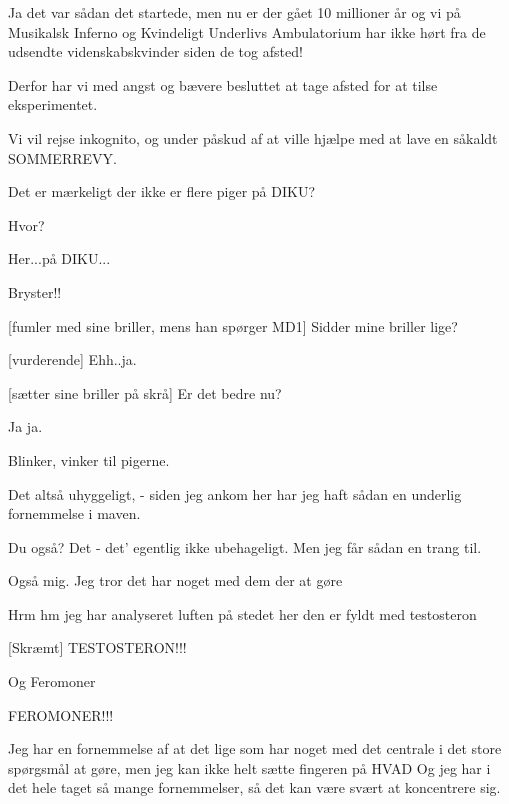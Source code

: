 \documentclass[a4paper,12pt]{article}
\begin{document}
\begin{sketch}

 Ja det var sådan det startede, men nu er der gået 10
millioner år og vi på Musikalsk Inferno og Kvindeligt Underlivs
Ambulatorium har ikke hørt fra de udsendte videnskabskvinder siden de
tog afsted!

 Derfor har vi med angst og bævere besluttet at tage afsted
for at tilse eksperimentet.

 Vi vil rejse inkognito, og under påskud af at ville hjælpe
med at lave en såkaldt SOMMERREVY.


 Det er mærkeligt der ikke er flere piger på DIKU?

 Hvor? 

 Her...på DIKU...

 Bryster!!

[fumler med sine briller, mens han spørger MD1] Sidder mine
briller lige?

[vurderende] Ehh..ja.

[sætter sine briller på skrå] Er det bedre nu?

 Ja ja.


 Blinker, vinker til pigerne.

 Det altså uhyggeligt, - siden jeg ankom her har jeg haft
sådan en underlig fornemmelse i maven.

 Du også? Det - det' egentlig ikke ubehageligt. Men jeg får
sådan en trang til.

 Også mig. Jeg tror det har noget med dem der at gøre

 Hrm hm jeg har analyseret luften på stedet her den er fyldt
med testosteron

[Skræmt] TESTOSTERON!!!

 Og Feromoner

 FEROMONER!!! 

 Jeg har en fornemmelse af at det lige som har noget med det
centrale i det store spørgsmål at gøre, men jeg kan ikke helt sætte
fingeren på HVAD  Og jeg har i
det hele taget så mange fornemmelser, så det kan være svært at
koncentrere sig.


\end{sketch}
\end{document}
